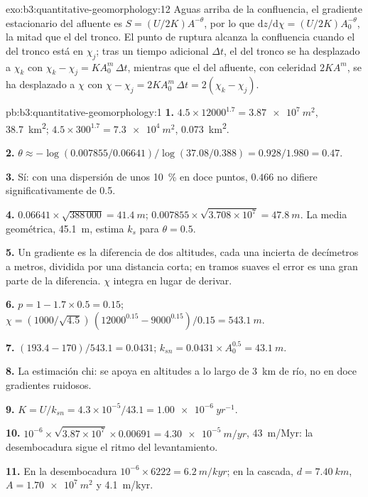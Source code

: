 \begin{solution}{exo:b3:quantitative-geomorphology:12}
Aguas arriba de la confluencia, el gradiente estacionario del afluente es $S = (U/2K)A^{-\theta}$,
por lo que $\mathrm{d}z/\mathrm{d}\chi = (U/2K)A_0^{-\theta}$, la mitad que el del tronco.
El punto de ruptura alcanza la confluencia cuando el del tronco está en $\chi_j$; tras un
tiempo adicional $\Delta t$, el del tronco se ha desplazado a $\chi_k$ con $\chi_k -
\chi_j = K A_0^m\,\Delta t$, mientras que el del afluente, con celeridad $2KA^m$,
se ha desplazado a $\chi$ con $\chi - \chi_j = 2KA_0^m\,\Delta t = 2(\chi_k -
\chi_j)$.
\end{solution}

\begin{solution}{pb:b3:quantitative-geomorphology:1}
\textbf{1.} $4.5\times12000^{1.7} = \qty{3.87e7}{m^2}$, \qty{38.7}{km^2};
$4.5\times300^{1.7} = \qty{7.3e4}{m^2}$, \qty{0.073}{km^2}.

\textbf{2.} $\theta \approx -\log(0.007855/0.06641)/\log(37.08/0.388) =
0.928/1.980 = 0.47$.

\textbf{3.} Sí: con una dispersión de unos \qty{10}{\percent} en doce puntos,
$0.466$ no difiere significativamente de 0.5.

\textbf{4.} $0.06641\times\sqrt{388\,000} = \qty{41.4}{m}$;
$0.007855\times\sqrt{3.708\times10^7} = \qty{47.8}{m}$. La media geométrica,
\qty{45.1}{m}, estima $k_s$ para $\theta = 0.5$.

\textbf{5.} Un gradiente es la diferencia de dos altitudes, cada una incierta
de decímetros a metros, dividida por una distancia corta; en tramos suaves
el error es una gran parte de la diferencia. $\chi$ integra en lugar de
derivar.

\textbf{6.} $p = 1 - 1.7\times0.5 = 0.15$; $\chi = (1000/\sqrt{4.5})\,
(12000^{0.15} - 9000^{0.15})/0.15 = \qty{543.1}{m}$.

\textbf{7.} $(193.4 - 170)/543.1 = 0.0431$; $k_{sn} = 0.0431\times A_0^{0.5}
= \qty{43.1}{m}$.

\textbf{8.} La estimación chi: se apoya en altitudes a lo largo de \qty{3}{km} de
río, no en doce gradientes ruidosos.

\textbf{9.} $K = U/k_{sn} = 4.3\times10^{-5}/43.1 = \qty{1.00e-6}{yr^{-1}}$.

\textbf{10.} $10^{-6}\times\sqrt{3.87\times10^7}\times0.00691 =
\qty{4.30e-5}{m/yr}$, \qty{43}{m/Myr}: la desembocadura sigue el ritmo del
levantamiento.

\textbf{11.} En la desembocadura $10^{-6}\times6222 = \qty{6.2}{m/kyr}$; en la
cascada, $d = \qty{7.40}{km}$, $A = \qty{1.70e7}{m^2}$ y
\qty{4.1}{m/kyr}.


\end{solution}
